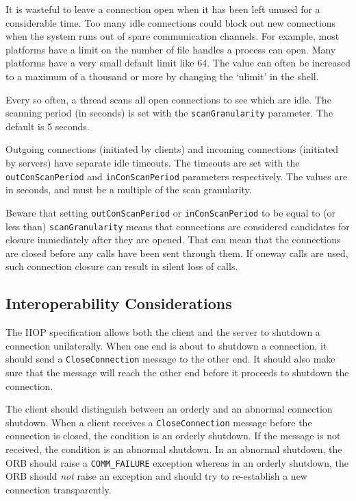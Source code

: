 \documentclass[11pt,oneside,a4paper]{book}
\newcommand{\code}[1]{\texttt{#1}}
\newcommand{\dsc}{\discretionary{}{}{}}
\begin{document}
It is wasteful to leave a connection open when it has been left unused
for a considerable time. Too many idle connections could block out new
connections when the system runs out of spare communication channels.
For example, most platforms have a limit on the number of file handles
a process can open. Many platforms have a very small default limit
like 64. The value can often be increased to a maximum of a thousand
or more by changing the `ulimit' in the shell.

Every so often, a thread scans all open connections to see which are
idle. The scanning period (in seconds) is set with the
\code{scanGranularity} parameter. The default is 5 seconds.

Outgoing connections (initiated by clients) and incoming connections
(initiated by servers) have separate idle timeouts.  The timeouts are
set with the \code{outConScan\dsc{}Period} and \code{inConScanPeriod}
parameters respectively. The values are in seconds, and must be a
multiple of the scan granularity.

Beware that setting \code{outConScanPeriod} or \code{inConScanPeriod}
to be equal to (or less than) \code{scanGranularity} means that
connections are considered candidates for closure immediately after
they are opened. That can mean that the connections are closed before
any calls have been sent through them. If oneway calls are used, such
connection closure can result in silent loss of calls.


\subsection{Interoperability Considerations}

The IIOP specification allows both the client and the server to
shutdown a connection unilaterally. When one end is about to shutdown
a connection, it should send a \code{CloseConnection} message to the
other end. It should also make sure that the message will reach the
other end before it proceeds to shutdown the connection.

The client should distinguish between an orderly and an abnormal
connection shutdown. When a client receives a \code{CloseConnection}
message before the connection is closed, the condition is an orderly
shutdown.  If the message is not received, the condition is an
abnormal shutdown.  In an abnormal shutdown, the ORB should raise a
\code{COMM\_FAILURE} exception whereas in an orderly shutdown, the ORB
should \emph{not} raise an exception and should try to re-establish a
new connection transparently.
\end{document}
